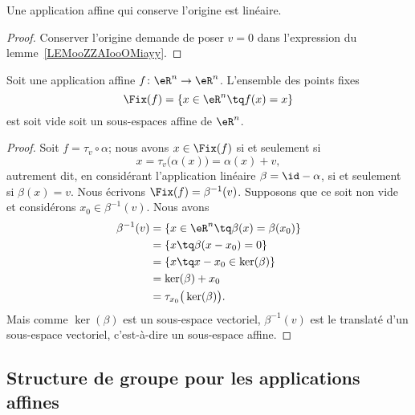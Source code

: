 \begin{corollary}       \label{CORooATCNooUwEPNI}
    Une application affine qui conserve l'origine est linéaire.
\end{corollary}

\begin{proof}
    Conserver l'origine demande de poser \( v=0\) dans l'expression du lemme~\ref{LEMooZZAIooOMiayy}.
\end{proof}

\begin{proposition}     \label{PROPooYRCJooIcmUVI}
    Soit une application affine \( f\colon \eR^n\to \eR^n\). L'ensemble des points fixes
    \begin{equation}
        \Fix(f)=\{ x\in \eR^n\tq f(x)=x \}
    \end{equation}
    est soit vide soit un sous-espaces affine de \( \eR^n\).
\end{proposition}

\begin{proof}
    Soit \( f=\tau_v\circ \alpha\); nous avons \( x\in\Fix(f)\) si et seulement si
    \begin{equation}
        x=\tau_v\big( \alpha(x) \big)=\alpha(x)+v,
    \end{equation}
    autrement dit, en considérant l'application linéaire \( \beta=\id-\alpha\), si et seulement si \( \beta(x)=v\). Nous écrivons \( \Fix(f)=\beta^{-1}(v)\). Supposons que ce soit non vide et considérons \( x_0\in\beta^{-1}(v)\). Nous avons
    \begin{subequations}
        \begin{align}
            \beta^{-1}(v)&=\{ x\in \eR^n\tq \beta(x)=\beta(x_0) \}\\
            &=\{ x\tq \beta(x-x_0)=0 \}\\
            &=\{ x\tq x-x_0\in \ker(\beta) \}\\
            &=\ker(\beta)+x_0\\
            &=\tau_{x_0}\big( \ker(\beta) \big).
        \end{align}
    \end{subequations}
    Mais comme \( \ker(\beta)\) est un sous-espace vectoriel, \( \beta^{-1}(v)\) est le translaté d'un sous-espace vectoriel, c'est-à-dire un sous-espace affine.
\end{proof}

\subsection{Structure de groupe pour les applications affines}

